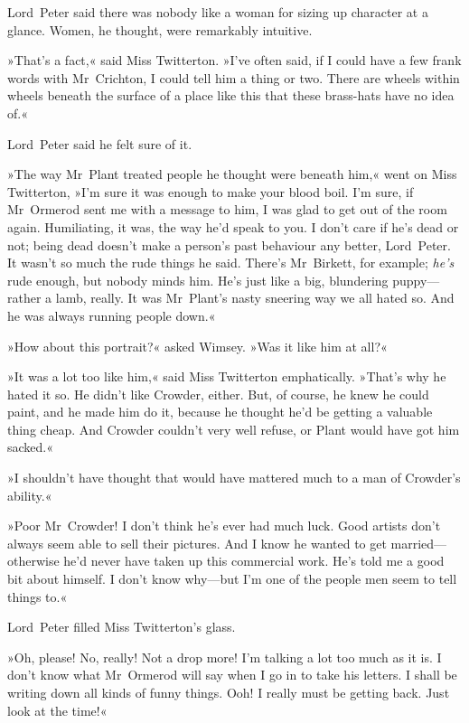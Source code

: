 Lord~Peter said there was nobody like a woman for sizing up character at a glance. Women, he thought, were remarkably intuitive.

»That's a fact,« said Miss Twitterton. »I've often said, if I could have a few frank words with Mr~Crichton, I could tell him a thing or two. There are wheels within wheels beneath the surface of a place like this that these brass-hats have no idea of.«

Lord~Peter said he felt sure of it.

»The way Mr~Plant treated people he thought were beneath him,« went on Miss Twitterton, »I'm sure it was enough to make your blood boil. I'm sure, if Mr~Ormerod sent me with a message to him, I was glad to get out of the room again. Humiliating, it was, the way he'd speak to you. I don't care if he's dead or not; being dead doesn't make a person's past behaviour any better, Lord~Peter. It wasn't so much the rude things he said. There's Mr~Birkett, for example; \textit{he's} rude enough, but nobody minds him. He's just like a big, blundering puppy—rather a lamb, really. It was Mr~Plant's nasty sneering way we all hated so. And he was always running people down.«

»How about this portrait?« asked Wimsey. »Was it like him at all?«

»It was a lot too like him,« said Miss Twitterton emphatically. »That's why he hated it so. He didn't like Crowder, either. But, of course, he knew he could paint, and he made him do it, because he thought he'd be getting a valuable thing cheap. And Crowder couldn't very well refuse, or Plant would have got him sacked.«

»I shouldn't have thought that would have mattered much to a man of Crowder's ability.«

»Poor Mr~Crowder! I don't think he's ever had much luck. Good artists don't always seem able to sell their pictures. And I know he wanted to get married—otherwise he'd never have taken up this commercial work. He's told me a good bit about himself. I don't know why—but I'm one of the people men seem to tell things to.«

Lord~Peter filled Miss Twitterton's glass.

»Oh, please! No, really! Not a drop more! I'm talking a lot too much as it is. I don't know what Mr~Ormerod will say when I go in to take his letters. I shall be writing down all kinds of funny things. Ooh! I really must be getting back. Just look at the time!«

